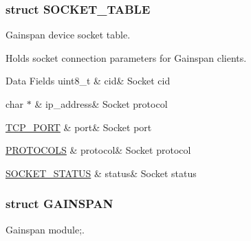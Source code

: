 \subsubsection{struct S\+O\+C\+K\+E\+T\+\_\+\+T\+A\+B\+LE}
Gainspan device socket table. 

Holds socket connection parameters for Gainspan clients. \begin{DoxyFields}{Data Fields}
uint8\+\_\+t\hypertarget{group__wireless__interface_a2becaf35e9d2f35ef54b8190933a338c}{}\label{group__wireless__interface_a2becaf35e9d2f35ef54b8190933a338c}
&
cid&
Socket cid \\
\hline

char $\ast$\hypertarget{group__wireless__interface_a6d5c7db37189c7c32245da2e24d7c065}{}\label{group__wireless__interface_a6d5c7db37189c7c32245da2e24d7c065}
&
ip\+\_\+address&
Socket protocol \\
\hline

\hyperlink{group__wireless__interface_ga6be486e56223df1b41c1f3a04cb7d471}{T\+C\+P\+\_\+\+P\+O\+RT}\hypertarget{group__wireless__interface_a3ab04eee4564c00d4c11d8f81859f807}{}\label{group__wireless__interface_a3ab04eee4564c00d4c11d8f81859f807}
&
port&
Socket port \\
\hline

\hyperlink{group__wireless__interface_ga2966051bfea778d846d94013f7cb888d}{P\+R\+O\+T\+O\+C\+O\+LS}\hypertarget{group__wireless__interface_a78d3e519e61ccc4d4a77663bc6271eee}{}\label{group__wireless__interface_a78d3e519e61ccc4d4a77663bc6271eee}
&
protocol&
Socket protocol \\
\hline

\hyperlink{group__wireless__interface_gab7faea06bd57469129426e00fcdfe8c7}{S\+O\+C\+K\+E\+T\+\_\+\+S\+T\+A\+T\+US}\hypertarget{group__wireless__interface_aed87b9da2d25de2b272b651caaee5ded}{}\label{group__wireless__interface_aed87b9da2d25de2b272b651caaee5ded}
&
status&
Socket status \\
\hline

\end{DoxyFields}
\label{struct_g_a_i_n_s_p_a_n}
\hypertarget{group__wireless__interface_struct_g_a_i_n_s_p_a_n}{}
\subsubsection{struct G\+A\+I\+N\+S\+P\+AN}
Gainspan module;. 

